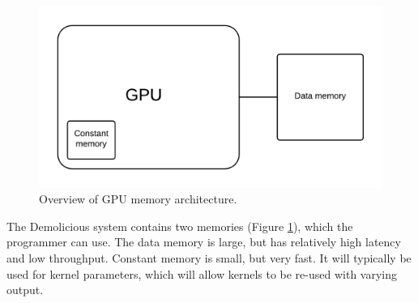 \begin{figure}[H]
	\centering
	\includegraphics[width=\textwidth]{system_overview/diagrams/memory_overview.png}
	\caption{Overview of GPU memory architecture.}
	\label{fig:memory_overview}
\end{figure}

The Demolicious system contains two memories (Figure \ref{fig:memory_overview}), which the programmer can use.
The data memory is large, but has relatively high latency and low throughput.
Constant memory is small, but very fast.
It will typically be used for kernel parameters,
which will allow kernels to be re-used with varying output.
